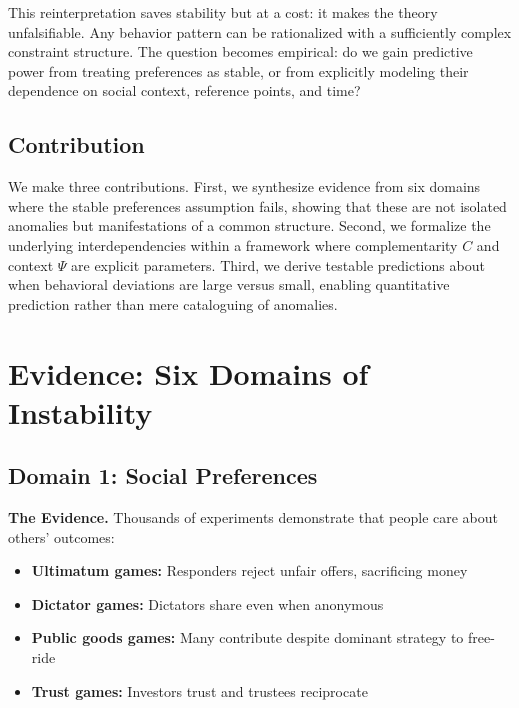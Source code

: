 \documentclass[12pt]{article}
\begin{document}
This reinterpretation saves stability but at a cost: it makes the theory unfalsifiable. Any behavior pattern can be rationalized with a sufficiently complex constraint structure. The question becomes empirical: do we gain predictive power from treating preferences as stable, or from explicitly modeling their dependence on social context, reference points, and time?

\subsection{Contribution}

We make three contributions. First, we synthesize evidence from six domains where the stable preferences assumption fails, showing that these are not isolated anomalies but manifestations of a common structure. Second, we formalize the underlying interdependencies within a framework where complementarity $C$ and context $\Psi$ are explicit parameters. Third, we derive testable predictions about when behavioral deviations are large versus small, enabling quantitative prediction rather than mere cataloguing of anomalies.



\section{Evidence: Six Domains of Instability}
\label{sec:evidence}

\subsection{Domain 1: Social Preferences}

\textbf{The Evidence.} Thousands of experiments demonstrate that people care about others' outcomes:
\begin{itemize}
    \item \textbf{Ultimatum games:} Responders reject unfair offers, sacrificing money \citep{guth1982}
    \item \textbf{Dictator games:} Dictators share even when anonymous \citep{forsythe1994}
    \item \textbf{Public goods games:} Many contribute despite dominant strategy to free-ride \citep{andreoni1988}
    \item \textbf{Trust games:} Investors trust and trustees reciprocate \citep{berg1995}
\end{itemize}
\end{document}

